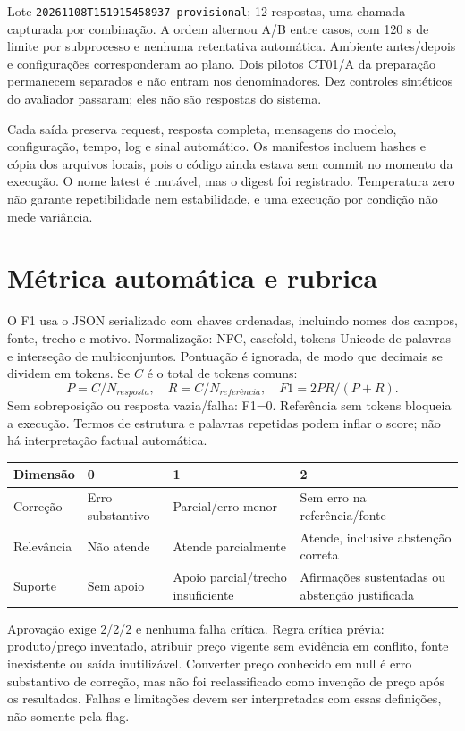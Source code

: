\documentclass[a4paper,12pt]{article}
\newcommand{\arquivo}[1]{\nolinkurl{#1}}
\begin{document}
Lote \arquivo{20261108T151915458937-provisional}; 12 respostas, uma chamada capturada por combinação. A ordem alternou A/B entre casos, com 120 s de limite por subprocesso e nenhuma retentativa automática. Ambiente antes/depois e configurações corresponderam ao plano. Dois pilotos CT01/A da preparação permanecem separados e não entram nos denominadores. Dez controles sintéticos do avaliador passaram; eles não são respostas do sistema.

Cada saída preserva request, resposta completa, mensagens do modelo, configuração, tempo, log e sinal automático. Os manifestos incluem hashes e cópia dos arquivos locais, pois o código ainda estava sem commit no momento da execução. O nome latest é mutável, mas o digest foi registrado. Temperatura zero não garante repetibilidade nem estabilidade, e uma execução por condição não mede variância.

\section{Métrica automática e rubrica}
O F1 usa o JSON serializado com chaves ordenadas, incluindo nomes dos campos, fonte, trecho e motivo. Normalização: NFC, casefold, tokens Unicode de palavras e interseção de multiconjuntos. Pontuação é ignorada, de modo que decimais se dividem em tokens. Se $C$ é o total de tokens comuns:
\[P=C/N_{resposta},\quad R=C/N_{referência},\quad F1=2PR/(P+R).\]
Sem sobreposição ou resposta vazia/falha: F1=0. Referência sem tokens bloqueia a execução. Termos de estrutura e palavras repetidas podem inflar o score; não há interpretação factual automática.

\begingroup\small
\begin{longtable}{@{}p{2.3cm}p{3.8cm}p{3.6cm}p{4.6cm}@{}}\toprule
Dimensão & 0 & 1 & 2 \\\midrule
Correção & Erro substantivo & Parcial/erro menor & Sem erro na referência/fonte \\
Relevância & Não atende & Atende parcialmente & Atende, inclusive abstenção correta \\
Suporte & Sem apoio & Apoio parcial/trecho insuficiente & Afirmações sustentadas ou abstenção justificada \\\bottomrule
\end{longtable}\endgroup
Aprovação exige 2/2/2 e nenhuma falha crítica. Regra crítica prévia: produto/preço inventado, atribuir preço vigente sem evidência em conflito, fonte inexistente ou saída inutilizável. Converter preço conhecido em null é erro substantivo de correção, mas não foi reclassificado como invenção de preço após os resultados. Falhas e limitações devem ser interpretadas com essas definições, não somente pela flag.
\end{document}

